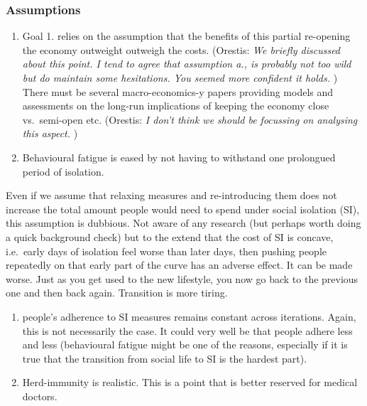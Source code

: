 \documentclass[
  english,
  ,doc,floatsintext]{apa6}
\begin{document}
\hypertarget{assumptions}{%
\subsubsection{Assumptions}\label{assumptions}}

\begin{enumerate}
\def\labelenumi{\arabic{enumi}.}
\item
  Goal 1. relies on the assumption that the benefits of this partial re-opening the economy outweight outweigh the costs.
  {\color{blue} {(\sf Orestis:} {\sl{We briefly discussed about this point. I tend to agree that assumption a., is probably not too wild but do maintain some hesitations. You seemed more confident it holds.}}     {\sf )}}
  There must be several macro-economics-y papers providing models and assessments on the long-run implications of keeping the economy close vs.~semi-open etc.
  {\color{blue} {(\sf Orestis:} {\sl{I don't think we should be focussing on analysing this aspect.}}     {\sf )}}
\item
  Behavioural fatigue is eased by not having to withstand one prolongued period of isolation.
\end{enumerate}

Even if we assume that relaxing measures and re-introducing them does not increase the total amount people would need to spend under social isolation (SI), this assumption is dubbious. Not aware of any research (but perhaps worth doing a quick background check) but to the extend that the cost of SI is concave, i.e.~early days of isolation feel worse than later days, then pushing people repeatedly on that early part of the curve has an adverse effect.
It can be made worse. Just as you get used to the new lifestyle, you now go back to the previous one and then back again. Transition is more tiring.

\begin{enumerate}
\def\labelenumi{\arabic{enumi}.}
\setcounter{enumi}{2}
\item
  people's adherence to SI measures remains constant across iterations.
  Again, this is not necessarily the case. It could very well be that people adhere less and less (behavioural fatigue might be one of the reasons, especially if it is true that the transition from social life to SI is the hardest part).
\item
  Herd-immunity is realistic.
  This is a point that is better reserved for medical doctors.
\end{enumerate}
\end{document}
